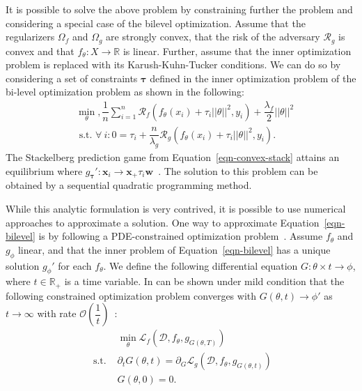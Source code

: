 It is possible to solve the above problem by constraining further the problem and considering a special case of the bilevel optimization. Assume that the regularizers $\Omega_f$ and $\Omega_g$ are strongly convex, that the risk of the adversary $\mathcal{R}_g$ is convex and that $f_\theta:X\to\mathbb{R}$ is linear. Further, assume that the inner optimization problem is replaced with its Karush-Kuhn-Tucker conditions. We can do so by considering a set of constraints $\bm\tau$ defined in the inner optimization problem of the bi-level optimization problem as shown in the following:
\begin{equation}
    \label{eqn-convex-stack}
    \begin{split}
    &\min_{\theta}, \dfrac{1}{n}\sum_{i=1}^n\mathcal{R}_f(f_\theta(x_i) + \tau_i||\theta||^2, y_i) + \dfrac{\lambda_f}{2}||\theta||^2\\
    &\text{ s.t. } \forall~i: 0=\tau_i + \dfrac{n}{\lambda_g}\mathcal{R}_g(f_\theta(x_i) + \tau_i||\theta||^2, y_i).
    \end{split}
\end{equation}
The Stackelberg prediction game from Equation~\eqref{eqn-convex-stack} attains an equilibrium where $g_{\bm\tau}':\bm x_i\to \bm x_ + \tau_i\bm w$~\cite{bruckner_stackelberg}. The solution to this problem can be obtained by a sequential quadratic programming method.

While this analytic formulation is very contrived, it is possible to use numerical approaches to approximate a solution. One way to approximate Equation~\eqref{eqn-bilevel} is by following a PDE-constrained optimization problem~\cite{naveiro_gradient_stackelberg}. Assume $f_\theta$ and $g_\phi$ linear, and that the inner problem of Equation~\eqref{eqn-bilevel} has a unique solution $g_\phi'$ for each $f_\theta$. We define the following differential equation $G:\theta\times t\to \phi$, where $t\in\mathbb{R}_+$ is a time variable. In can be shown under mild condition that the following constrained optimization problem converges with $G(\theta,t)\to \phi'$ as $t\to\infty$ with rate $\mathcal O(\dfrac{1}{t})$~\cite{naveiro_gradient_stackelberg}:
\begin{equation*}
    \begin{split}
        &\min_\theta \mathcal{L}_f(\mathcal{D}, f_\theta, g_{G(\theta,T)})\\
        \text{ s.t. } &\partial_tG(\theta, t) = \partial_G\mathcal{L}_g(\mathcal{D}, f_\theta, g_{G(\theta, t)})\\
        & G(\theta, 0) = 0.
    \end{split}
\end{equation*}


